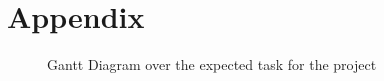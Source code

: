 \documentclass[a4paper,8pt]{article}
\begin{document}
		\begin{figure}[tbp]
			\begin{center}
			\end{center}

		\end{figure}
	\printbibliography
	
	
	\section{Appendix}
	\begin{figure}[!h]
		\begin{center}
		\end{center}
		\caption{Gantt Diagram over the expected task for the project}
		\label{img:Gantt}
	\end{figure}
\end{document}
